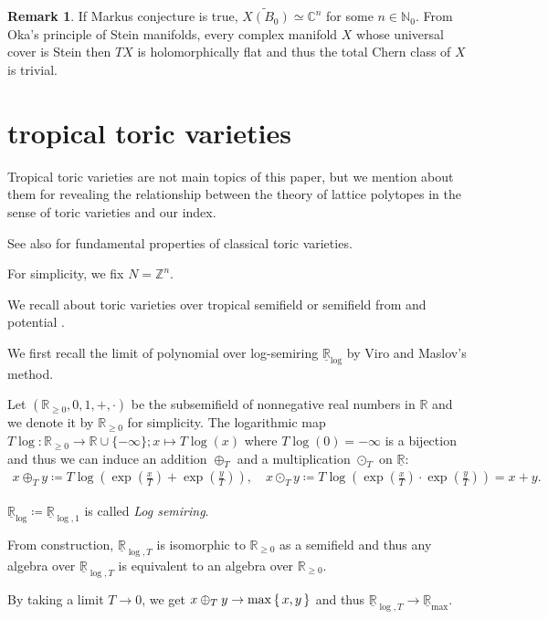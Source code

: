 \documentclass[a4paper,dvipdfmx,reqno,12pt]{amsart}
\makeatletter
\newcommand{\ind}[2]{\emph{#1}\index{1{#2}@{#1}}}
\theoremstyle{definition}
\newtheorem{Rmk}[Thm]{Remark}
\newcommand{\deq}{\coloneqq}
\newcommand{\C}{\mathbb{C}}%
\newcommand{\R}{\mathbb{R}}%
\newcommand{\Z}{\mathbb{Z}}%
\newcommand{\N}{\mathbb{N}_{0}}%
\newcommand{\opn}[1]{\operatorname{#1}}
\numberwithin{equation}{section}
\makeatother
\begin{document}
\begin{Rmk}
  If Markus conjecture is true, $\widetilde{X(B_0)}\simeq \C^{n}$
  for some $n\in \N$. From Oka's principle of Stein manifolds,
  every complex manifold $X$ whose universal cover is Stein
  then $TX$ is holomorphically flat and thus the total Chern class of $X$
  is trivial.
\end{Rmk}

\section{tropical toric varieties} \label{sec: toric}

Tropical toric varieties are not main topics of this paper,
but we mention about them for revealing the relationship
between the theory of lattice polytopes in the sense of
toric varieties and our index.

See also \cite{coxToricVarieties2011a} for fundamental properties of classical toric varieties.


For simplicity, we fix $N=\Z^{n}$.

We recall about toric varieties over tropical semifield or semifield
from \cite{MR2428356} and potential .

We first recall the limit of polynomial over log-semiring $\underline{\R}_{\opn{log}}$
by Viro and Maslov's method.

Let $(\R_{\geq 0},0,1,+,\cdot)$ be the subsemifield
of nonnegative real numbers in $\R$ and we denote it by $\R_{\geq 0}$
for simplicity.
The logarithmic map
$T\log : \R_{\geq 0}\to \R\cup \{-\infty\}; x\mapsto T\log (x)$ where $T\log (0)=-\infty$
is a bijection and thus we can induce an addition $\oplus_{T}$
and a multiplication $\odot_{T}$ on $\underline{\R}$:
\begin{align}
  x\oplus_{T}y \deq T\log(\opn{exp}(\frac{x}{T})+\opn{exp}(\frac{y}{T})),
  \quad x\odot_T y \deq T\log(\opn{exp}(\frac{x}{T})\cdot\opn{exp}(\frac{y}{T}))=x+y.
\end{align}




$\underline{\R}_{\opn{log}}\deq \underline{\R}_{\opn{log},1}$ is called \ind{Log semiring}{Log semiring}.



From construction, $\underline{\R}_{\opn{log},T}$ is isomorphic to
$\R_{\geq 0}$ as a semifield and thus any algebra over
$\underline{\R}_{\opn{log},T}$ is equivalent to
an algebra over $\R_{\geq 0}$.

By taking a limit $T\to 0$, we get $x\oplus_T y\to \opn{max}\set{x,y}$
and thus $\underline{\R}_{\opn{log},T} \to \underline{\R}_{\max}$.
\end{document}
